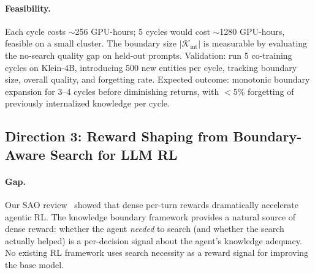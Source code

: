 \documentclass[11pt,a4paper]{article}
\begin{document}
\paragraph{Feasibility.} Each cycle costs ${\sim}$256 GPU-hours; 5 cycles would cost ${\sim}$1280 GPU-hours, feasible on a small cluster. The boundary size $|\mathcal{K}_{\mathrm{int}}|$ is measurable by evaluating the no-search quality gap on held-out prompts. Validation: run 5 co-training cycles on Klein-4B, introducing 500 new entities per cycle, tracking boundary size, overall quality, and forgetting rate. Expected outcome: monotonic boundary expansion for 3--4 cycles before diminishing returns, with $<$5\% forgetting of previously internalized knowledge per cycle.

\subsection{Direction 3: Reward Shaping from Boundary-Aware Search for LLM RL}

\paragraph{Gap.} Our SAO review~\cite{sao2026} showed that dense per-turn rewards dramatically accelerate agentic RL. The knowledge boundary framework provides a natural source of dense reward: whether the agent \emph{needed} to search (and whether the search actually helped) is a per-decision signal about the agent's knowledge adequacy. No existing RL framework uses search necessity as a reward signal for improving the base model.
\end{document}
